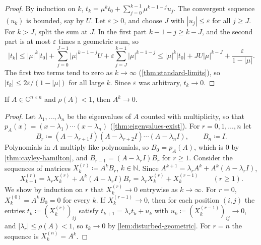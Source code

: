\begin{proof}
By induction on $k$, $t_k=\mu^kt_0+\sum_{j=0}^{k-1}\mu^{k-1-j}u_j$. The convergent sequence $(u_k)$ is bounded, say by $U$. Let $\varepsilon>0$, and choose $J$ with $|u_j|\le\varepsilon$ for all $j\ge J$. For $k>J$, split the sum at $J$. In the first part $k-1-j\ge k-J$, and the second part is at most $\varepsilon$ times a geometric sum, so
\[
|t_k|\le|\mu|^k|t_0|+\sum_{j=0}^{J-1}|\mu|^{k-1-j}U+\varepsilon\sum_{j=J}^{k-1}|\mu|^{k-1-j}\le|\mu|^k|t_0|+JU|\mu|^{k-J}+\frac{\varepsilon}{1-|\mu|}.
\]
The first two terms tend to zero as $k\to\infty$ (\cref{thm:standard-limits}), so $|t_k|\le2\varepsilon/(1-|\mu|)$ for all large $k$. Since $\varepsilon$ was arbitrary, $t_k\to0$.
\end{proof}

\begin{corollary}
\label{cor:powers-general}
If $A\in\mathbb C^{n\times n}$ and $\rho(A)<1$, then $A^k\to0$.
\end{corollary}

\begin{proof}
Let $\lambda_1,\ldots,\lambda_n$ be the eigenvalues of $A$ counted with multiplicity, so that $p_A(x)=(x-\lambda_1)\cdots(x-\lambda_n)$ (\cref{thm:eigenvalues-exist}). For $r=0,1,\ldots,n$ let
\[
B_r\coloneqq(A-\lambda_{r+1}I)(A-\lambda_{r+2}I)\cdots(A-\lambda_nI),\qquad B_n\coloneqq I .
\]
Polynomials in $A$ multiply like polynomials, so $B_0=p_A(A)$, which is $0$ by \cref{thm:cayley-hamilton}, and $B_{r-1}=(A-\lambda_rI)B_r$ for $r\ge1$. Consider the sequences of matrices $X^{(r)}_k\coloneqq A^kB_r$, $k\in\mathbb N$. Since $A^{k+1}=\lambda_rA^k+A^k(A-\lambda_rI)$,
\[
X^{(r)}_{k+1}=\lambda_rX^{(r)}_k+A^k(A-\lambda_rI)B_r=\lambda_rX^{(r)}_k+X^{(r-1)}_k\qquad(r\ge1).
\]
We show by induction on $r$ that $X^{(r)}_k\to0$ entrywise as $k\to\infty$. For $r=0$, $X^{(0)}_k=A^kB_0=0$ for every $k$. If $X^{(r-1)}_k\to0$, then for each position $(i,j)$ the entries $t_k\coloneqq(X^{(r)}_k)_{ij}$ satisfy $t_{k+1}=\lambda_rt_k+u_k$ with $u_k\coloneqq(X^{(r-1)}_k)_{ij}\to0$, and $|\lambda_r|\le\rho(A)<1$, so $t_k\to0$ by \cref{lem:disturbed-geometric}. For $r=n$ the sequence is $X^{(n)}_k=A^k$.
\end{proof}


